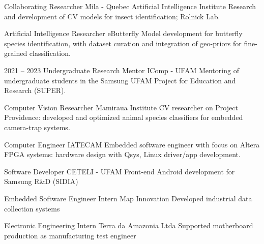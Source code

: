 \documentclass[10pt]{developercv} %
\begin{document}


\begin{entrylist}

  {Collaborating Researcher}
  {Mila - Quebec Artificial Intelligence Institute}
  {Research and development of CV models for insect identification; Rolnick
Lab.}


  {Artificial Intelligence Researcher}
  {eButterfly}
  {Model development for butterfly species identification, with dataset curation
and integration of geo-priors for fine-grained classification.}

  \entry
  {2021 -- 2023}
  {Undergraduate Research Mentor}
  {IComp - UFAM}
  {Mentoring of undergraduate students in the Samsung UFAM Project for Education
and Research (SUPER).}

  {Computer Vision Researcher}
  {Mamiraua Institute}
  {CV researcher on Project Providence: developed and optimized animal species
classifiers for embedded camera-trap systems.}


  {Computer Engineer}
  {IATECAM}
  {Embedded software engineer with focus on Altera FPGA systems: hardware design
with Qsys, Linux driver/app development.}

  {Software Developer}
  {CETELI - UFAM}
  {Front-end Android development for Samsung R\&D (SIDIA)}

  {Embedded Software Engineer Intern}
  {Map Innovation}
  {Developed industrial data collection systems}

  {Electronic Engineering Intern}
  {Terra da Amazonia Ltda}
  {Supported motherboard production as manufacturing test engineer}
\end{entrylist}

\vspace{1.2cm}

\end{document}
